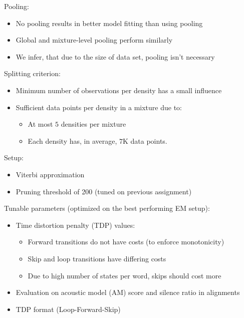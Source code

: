 \documentclass[11pt, a4paper, landscape]{article}
\begin{document}
\NewPage{}
\vfill
Pooling:
\begin{itemize}
	\item No pooling results in better model fitting than using pooling 
	\item Global and mixture-level pooling perform similarly 
	\item We infer, that due to the size of data set, pooling isn't necessary
\end{itemize}
\vspace{20pt}
Splitting criterion:
\begin{itemize}
	\item Minimum number of observations per density has a small influence
	\item Sufficient data points per density in a mixture due to:
	\begin{itemize}
		\item At most $5$ densities per mixture
		\item Each density has, in average, $7$K data points.
	\end{itemize}
\end{itemize}
\vfill

\NewPage{}
\vfill
Setup:
\begin{itemize}
  \item Viterbi approximation
  \item Pruning threshold of 200 (tuned on previous assignment) 
\end{itemize}
\vspace{20pt}
Tunable parameters (optimized on the best performing EM setup):
\begin{itemize}
	\item Time distortion penalty (TDP) values:
    \begin{itemize}
      \item Forward transitions do not have costs (to enforce monotonicity)
      \item Skip and loop transitions have differing costs
      \item Due to high number of states per word, skips should cost more
    \end{itemize}
\end{itemize}
\vfill

\NewPage{}
\vfill
\begin{itemize}
  \item Evaluation on acoustic model (AM) score and silence ratio in alignments
  \item TDP format (Loop-Forward-Skip) 
\end{itemize}
\end{document}
